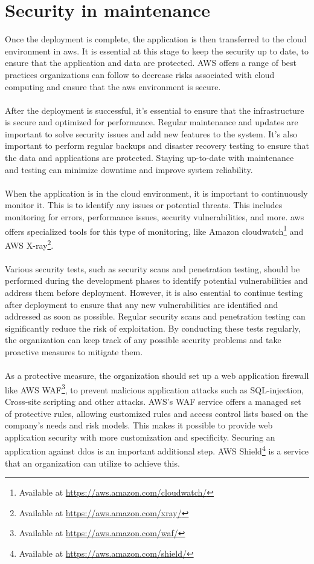 \section{Security in maintenance}
Once the deployment is complete, the application is then transferred to the cloud environment in \acrlong{aws}. It is essential at this stage to keep the security up to date, to ensure that the application and data are protected. AWS offers a range of best practices organizations can follow to decrease risks associated with cloud computing and ensure that the  \acrshort{aws} environment is secure.
\\~\\
After the deployment is successful, it's essential to ensure that the infrastructure is secure and optimized for performance. Regular maintenance and updates are important to solve security issues and add new features to the system. It's also important to perform regular backups and disaster recovery testing to ensure that the data and applications are protected. 
Staying up-to-date with maintenance and testing can minimize downtime and improve system reliability. 
\\~\\
When the application is in the cloud environment, it is important to continuously monitor it. This is to identify any issues or potential threats. This includes monitoring for errors, performance issues, security vulnerabilities, and more. \acrshort{aws} offers specialized tools for this type of monitoring, like Amazon cloudwatch\footnote{Available at \url{https://aws.amazon.com/cloudwatch/}} and AWS X-ray\footnote{Available at \url{https://aws.amazon.com/xray/}}. 
\\~\\
Various security tests, such as security scans and penetration testing, should be performed during the development phases to identify potential vulnerabilities and address them before deployment. However, it is also essential to continue testing after deployment to ensure that any new vulnerabilities are identified and addressed as soon as possible. Regular security scans and penetration testing can significantly reduce the risk of exploitation. By conducting these tests regularly, the organization can keep track of any possible security problems and take proactive measures to mitigate them.
\\~\\
As a protective measure, the organization should set up a web application firewall like AWS WAF\footnote{Available at \url{https://aws.amazon.com/waf/}}, to prevent malicious application attacks such as \gls{SQL-injection}, \gls{Cross-site scripting} and other attacks. AWS's WAF service offers a managed set of protective rules, allowing customized rules and access control lists based on the company's needs and risk models. This makes it possible to provide web application security with more customization and specificity. Securing an application against \gls{ddos} is an important additional step. AWS Shield\footnote{Available at \url{https://aws.amazon.com/shield/}} is a service that an organization can utilize to achieve this. \cite{awsafterdep}
